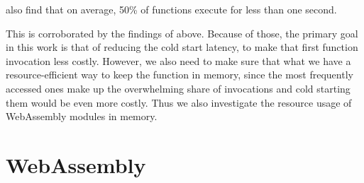 \citeauthor{Shahrad2020} also find that on average, 50\% of functions execute for less than one second.

\begin{quote}
\end{quote}

This is corroborated by the findings of \citeauthor{Wang2018} above.
Because of those, the primary goal in this work is that of reducing the cold start latency, to make that first function invocation less costly. However, we also need to make sure that what we have a resource-efficient way to keep the function in memory, since the most frequently accessed ones make up the overwhelming share of invocations and cold starting them would be even more costly. Thus we also investigate the resource usage of WebAssembly modules in memory.


\section{WebAssembly}


